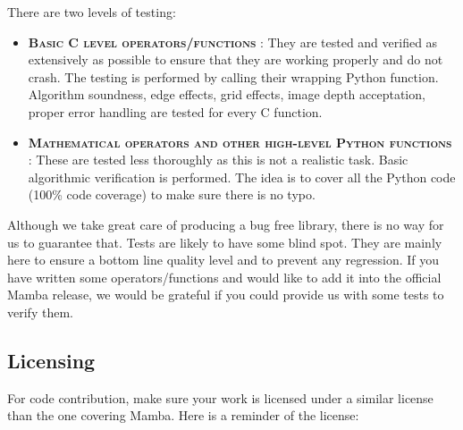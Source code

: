 \documentclass[a4paper,10pt,oneside]{article}
\begin{document}
There are two levels of testing:

\begin{itemize}
\item \textbf{\textsc{Basic C level operators/functions}} :
They are tested and verified as extensively as possible to ensure that they
are working properly and do not crash. The testing is performed by calling their
wrapping Python function. Algorithm soundness, edge effects,
grid effects, image depth acceptation, proper error handling are tested for every
C function.
\item \textbf{\textsc{Mathematical operators and other high-level Python functions}} :
These are tested less thoroughly as this is not a realistic task. Basic
algorithmic verification is performed. The idea is to cover all the Python code
(100\% code coverage) to make sure there is no typo.
\end{itemize}

Although we take great care of producing a bug free library, there is no way
for us to guarantee that. Tests are likely to have some blind spot. They are
mainly here to ensure a bottom line quality level and to prevent any regression.
If you have written some operators/functions and would like to add it into the
official Mamba release, we would be grateful if you could provide us with some
tests to verify them.

\subsection{Licensing}

\label{cha:Licensing}

For code contribution, make sure your work is licensed under a similar
license than the one covering Mamba. Here is a reminder of the license:

\end{document}
